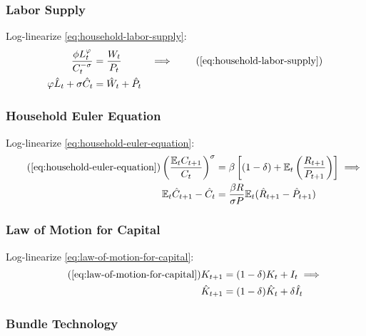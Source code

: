\documentclass[
	thesis.tex
	]{subfiles}
\begin{document}

\subsubsection{Labor Supply}

Log-linearize \ref{eq:household-labor-supply}:
\begin{alignat}{2}
	\frac{\phi L_t^{\varphi}}{C_t^{-\sigma}} &= \frac{W_t}{P_t} & \implies \tag{\ref{eq:household-labor-supply}} \\
	\varphi \hat{L}_t + \sigma \hat{C}_t &= \hat{W}_t + \hat{P}_t & \label{eq:ll-labor-supply}
\end{alignat}


\subsubsection{Household Euler Equation}

Log-linearize \ref{eq:household-euler-equation}:
\begin{align}
	\tag{\ref{eq:household-euler-equation}}
	\left( \frac{\mathbb{E}_t C_{t+1}}{C_t} \right)^\sigma &= \beta \left[ (1-\delta) + \mathbb{E}_t \left(\frac{R_{t+1}}{P_{t+1}}\right) \right] \implies \\
	\label{eq:ll-household-euler-equation}
	\E \hat{C}_{t+1} - \hat{C}_t &= \frac{\beta R}{\sigma P} \E(\hat{R}_{t+1} - \hat{P}_{t+1})
\end{align}


\subsubsection{Law of Motion for Capital}

Log-linearize \ref{eq:law-of-motion-for-capital}:
\begin{align}
	\tag{\ref{eq:law-of-motion-for-capital}}
	K_{t+1} &= (1-\delta)K_t + I_t \implies \\
	\label{eq:ll-law-of-motion-for-capital}
	\hat{K}_{t+1} &= (1-\delta)\hat{K}_t + \delta \hat{I}_t
\end{align}


\subsubsection{Bundle Technology}
\end{document}
